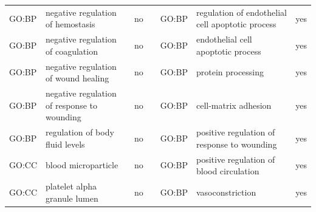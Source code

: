 \begin{longtable}{@{}lp{4cm}lllp{4cm}l@{}}
GO:BP           & negative regulation of hemostasis                                                                                                  & no               &           & GO:BP           & regulation of endothelial cell apoptotic process                                                                                                                       & yes              \\
GO:BP           & negative regulation of coagulation                                                                                                 & no               &           & GO:BP           & endothelial cell apoptotic process                                                                                                                                     & yes              \\
GO:BP           & negative regulation of wound healing                                                                                               & no               &           & GO:BP           & protein processing                                                                                                                                                     & yes              \\
GO:BP           & negative regulation of response to wounding                                                                                        & no               &           & GO:BP           & cell-matrix adhesion                                                                                                                                                   & yes              \\
GO:BP           & regulation of body fluid levels                                                                                                    & no               &           & GO:BP           & positive regulation of response to wounding                                                                                                                            & yes              \\
GO:CC           & blood microparticle                                                                                                                & no               &           & GO:BP           & positive regulation of blood circulation                                                                                                                               & yes              \\
GO:CC           & platelet alpha granule lumen                                                                                                       & no               &           & GO:BP           & vasoconstriction                                                                                                                                                       & yes              \\

\end{longtable}

